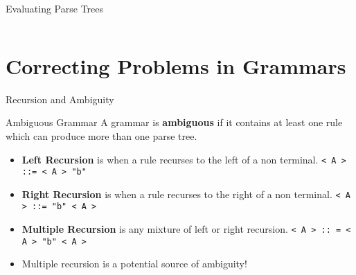 \documentclass[handout]{beamer}
\newenvironment{code}{%
 \VerbatimEnvironment
 \begin{adjustbox}{max width=\textwidth, max height=0.7\textheight}
 \begin{BVerbatim}
  }{
  \end{BVerbatim}
 \end{adjustbox}
}
\begin{document}
\begin{frame}[fragile]{Evaluating Parse Trees}
\begin{columns}
\end{columns}    
\end{frame}

\section{Correcting Problems in Grammars}

\begin{frame}{Recursion and Ambiguity}
\begin{block}{Ambiguous Grammar}
    A grammar is {\bf ambiguous} if it contains at least one rule which can produce more than one parse tree.
\end{block}
\begin{itemize}
    \item {\bf Left Recursion} is when a rule recurses to the left of a non terminal. \texttt{< A > ::= < A > "b"}
    \item {\bf Right Recursion} is when a rule recurses to the right of a non terminal. \texttt{< A > ::= "b" < A > }
    \item {\bf Multiple Recursion} is any mixture of left or right recursion. \texttt{< A > :: = < A > "b" < A >}
    \item Multiple recursion is a potential source of ambiguity!
\end{itemize}
\end{frame}
\end{document}
